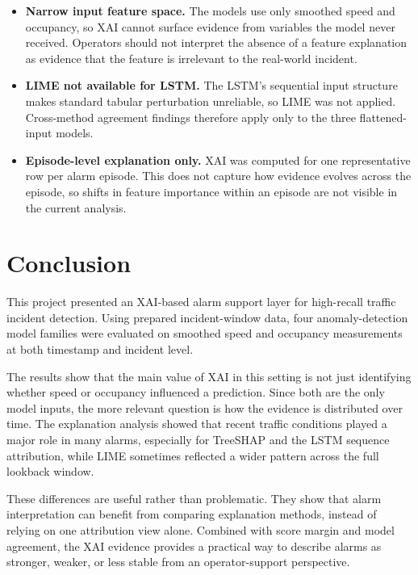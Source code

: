 \documentclass[10pt,a4paper]{article}
\begin{document}
	\begin{itemize}
		\item \textbf{Narrow input feature space.} The models use only smoothed speed and
		occupancy, so XAI cannot surface evidence from variables the model never received.
		Operators should not interpret the absence of a feature explanation as evidence
		that the feature is irrelevant to the real-world incident.
		
		
		\item \textbf{LIME not available for LSTM.} The LSTM's sequential input structure
		makes standard tabular perturbation unreliable, so LIME was not applied. Cross-method
		agreement findings therefore apply only to the three flattened-input models.
		
		\item \textbf{Episode-level explanation only.} XAI was computed for one
		representative row per alarm episode. This does not capture how evidence evolves
		across the episode, so shifts in feature importance within an episode are not
		visible in the current analysis.
		
	
	\end{itemize}
	
	\section{Conclusion}
	
	This project presented an XAI-based alarm support layer for high-recall traffic incident detection. Using prepared incident-window data, four anomaly-detection model families were evaluated on smoothed speed and occupancy measurements at both timestamp and incident level.
	
	The results show that the main value of XAI in this setting is not just identifying whether speed or occupancy influenced a prediction. Since both are the only model inputs, the more relevant question is how the evidence is distributed over time. The explanation analysis showed that recent traffic conditions played a major role in many alarms, especially for TreeSHAP and the LSTM sequence attribution, while LIME sometimes reflected a wider pattern across the full lookback window.
	
	These differences are useful rather than problematic. They show that alarm interpretation can benefit from comparing explanation methods, instead of relying on one attribution view alone. Combined with score margin and model agreement, the XAI evidence provides a practical way to describe alarms as stronger, weaker, or less stable from an operator-support perspective.
	
\end{document}
